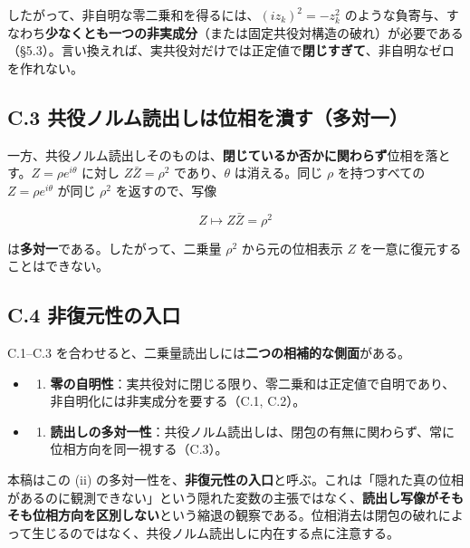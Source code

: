 \documentclass[11pt,a4paper]{ltjsarticle}
\providecommand{\tightlist}{\setlength{\itemsep}{0pt}\setlength{\parskip}{0pt}}
\begin{document}
したがって、非自明な零二乗和を得るには、\((i z_k)^2=-z_k^2\)
のような負寄与、すなわち\textbf{少なくとも一つの非実成分}（または固定共役対構造の破れ）が必要である（§5.3）。言い換えれば、実共役対だけでは正定値で\textbf{閉じすぎて}、非自明なゼロを作れない。

\subsection{C.3
共役ノルム読出しは位相を潰す（多対一）}\label{c.3-ux5171ux5f79ux30ceux30ebux30e0ux8aadux51faux3057ux306fux4f4dux76f8ux3092ux6f70ux3059ux591aux5bfeux4e00}

一方、共役ノルム読出しそのものは、\textbf{閉じているか否かに関わらず}位相を落とす。\(Z=\rho e^{i\theta}\)
に対し \(Z\bar Z=\rho^2\) であり、\(\theta\) は消える。同じ \(\rho\)
を持つすべての \(Z=\rho e^{i\theta}\) が同じ \(\rho^2\) を返すので、写像

\[
Z\longmapsto Z\bar Z=\rho^2
\]

は\textbf{多対一}である。したがって、二乗量 \(\rho^2\) から元の位相表示
\(Z\) を一意に復元することはできない。

\subsection{C.4
非復元性の入口}\label{c.4-ux975eux5fa9ux5143ux6027ux306eux5165ux53e3}

C.1--C.3
を合わせると、二乗量読出しには\textbf{二つの相補的な側面}がある。

\begin{itemize}
\tightlist
\item
  \begin{enumerate}
  \def\labelenumi{(\roman{enumi})}
  \tightlist
  \item
    \textbf{零の自明性}：実共役対に閉じる限り、零二乗和は正定値で自明であり、非自明化には非実成分を要する（C.1,
    C.2）。
  \end{enumerate}
\item
  \begin{enumerate}
  \def\labelenumi{(\roman{enumi})}
  \setcounter{enumi}{1}
  \tightlist
  \item
    \textbf{読出しの多対一性}：共役ノルム読出しは、閉包の有無に関わらず、常に位相方向を同一視する（C.3）。
  \end{enumerate}
\end{itemize}

本稿はこの (ii)
の多対一性を、\textbf{非復元性の入口}と呼ぶ。これは「隠れた真の位相があるのに観測できない」という隠れた変数の主張ではなく、\textbf{読出し写像がそもそも位相方向を区別しない}という縮退の観察である。位相消去は閉包の破れによって生じるのではなく、共役ノルム読出しに内在する点に注意する。
\end{document}
